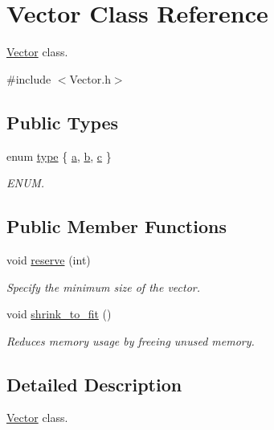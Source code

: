 \hypertarget{classVector}{}\section{Vector Class Reference}
\label{classVector}


\hyperlink{classVector}{Vector} class.  




{\ttfamily \#include $<$Vector.\+h$>$}

\subsection*{Public Types}
\begin{DoxyCompactItemize}
\item 
enum \hyperlink{classVector_a9f4bb1bae098af3059782033c86a424f}{type} \{ \hyperlink{classVector_a9f4bb1bae098af3059782033c86a424fa7a79087865a0905ff91d0c4426a3e790}{a}, 
\hyperlink{classVector_a9f4bb1bae098af3059782033c86a424fab6301803a0c4515686f7cf42a6a4b6bb}{b}, 
\hyperlink{classVector_a9f4bb1bae098af3059782033c86a424faff6e3c299b8d8e3b82d3f2ea7c11a3df}{c}
 \}\begin{DoxyCompactList}\small\item\em E\+N\+UM. \end{DoxyCompactList}
\end{DoxyCompactItemize}
\subsection*{Public Member Functions}
\begin{DoxyCompactItemize}
\item 
void \hyperlink{classVector_a71ba7f43b61db58b835ca1147ac34635}{reserve} (int)
\begin{DoxyCompactList}\small\item\em Specify the minimum size of the vector. \end{DoxyCompactList}\item 
void \hyperlink{classVector_af31839ca019edc1784fd3e700834df1d}{shrink\+\_\+to\+\_\+fit} ()
\begin{DoxyCompactList}\small\item\em Reduces memory usage by freeing unused memory. \end{DoxyCompactList}\end{DoxyCompactItemize}


\subsection{Detailed Description}
\hyperlink{classVector}{Vector} class. 

